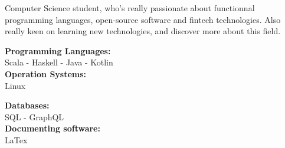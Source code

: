 \documentclass[10pt]{developercv} %
\begin{document}
\begin{minipage}[t]{0.4\textwidth} %
    \break
	\vspace{-\baselineskip} %
	
    {Computer Science student, who's really passionate about functionnal programming languages, 
    open-source software and fintech technologies.
    \newline Also really keen on learning new technologies, and discover more about this field. 
	}%
\end{minipage}
\hfill %
\begin{minipage}[t]{0.575\textwidth} %
    \break
	\vspace{-\baselineskip} %
	    \begin{minipage}[t]{0.475 \textwidth}
	 		\textbf{Programming Languages:}\\
	 		\vspace{0.3em}
    		{\hspace{2pt}Scala - Haskell - Java - Kotlin}\\
    		\textbf{Operation Systems:}\\
	 		\vspace{0.3em}
    		{\hspace{2pt}Linux}\\
	    \end{minipage}
        \hfill
	    \begin{minipage}[t]{0.5 \textwidth}
	 		\textbf{Databases:}\\
            \vspace{0.3em}
            {\hspace{2pt}SQL - GraphQL}\\
       		\textbf{Documenting software:}\\
	 		\vspace{0.3em}
    		{\hspace{2pt} LaTex}\\
        \end{minipage}
\end{minipage}

\end{document}
